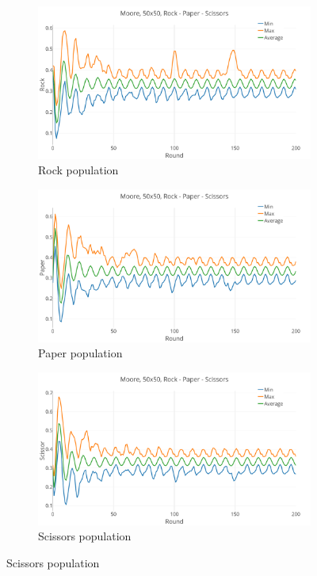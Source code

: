 \documentclass[a4paper, 11pt]{article}
\begin{document}
\begin{landscape}
\begin{figure}[H]
	\begin{subfigure}{0.53\textwidth}
		\includegraphics[width=1\linewidth]{50x50_40RockDist_Rock}
		\caption{Rock population}
	\end{subfigure}%
	\begin{subfigure}{0.53\textwidth}
		\includegraphics[width=1\linewidth]{50x50_40RockDist_Paper}
		\caption{Paper population}
	\end{subfigure}%
	\begin{subfigure}{0.53\textwidth}
		\includegraphics[width=1\linewidth]{50x50_40RockDist_Scissors}
		\caption{Scissors population}
	\end{subfigure}
\end{figure}


\end{landscape}
\end{document}
